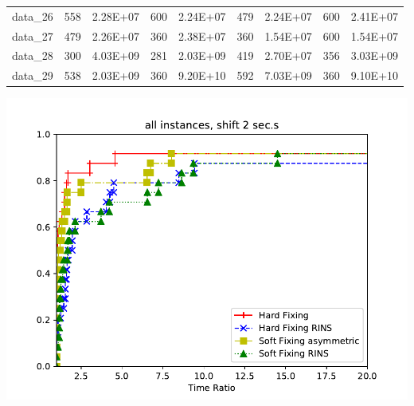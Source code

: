 \begin{table}[!h]
\begin{tabular}{lllllllll}
data\_26 & 558               & 2.28E+07             & 600                                      & 2.24E+07                                     & 479                                         & 2.24E+07                                        & 600                                      & 2.41E+07                                     \\
data\_27 & 479               & 2.26E+07             & 360                                      & 2.38E+07                                     & 360                                         & 1.54E+07                                        & 600                                      & 1.54E+07                                     \\
data\_28 & 300               & 4.03E+09             & 281                                      & 2.03E+09                                     & 419                                         & 2.70E+07                                        & 356                                      & 3.03E+09                                     \\
data\_29 & 538               & 2.03E+09             & 360                                      & 9.20E+10                                     & 592                                         & 7.03E+09                                        & 360                                      & 9.10E+10                                     \\ \hline
\end{tabular}
\end{table}

\begin{center}
	\includegraphics[scale=0.7]{Graphics/Matheuristic.pdf}
	\label{img:mathperfprof}
\end{center}